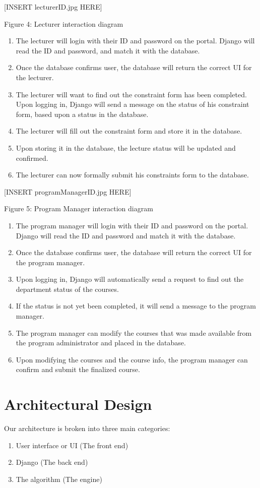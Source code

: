 \documentclass[12pt,article]{memoir}
\begin{document}
[INSERT lecturerID.jpg HERE]

 Figure 4: Lecturer interaction diagram

\begin{enumerate}
\item The lecturer will login with their ID and password on the portal. Django will read the ID and password, and match it with the database. 
\item Once the database confirms user, the database will return the correct UI for the lecturer.
\item The lecturer will want to find out the constraint form has been completed. Upon logging in, Django will send a message on the status of his constraint form, based upon a status in the database.
\item The lecturer will fill out the constraint form and store it in the database.
\item Upon storing it in the database, the lecture status will be updated and confirmed. 
\item The lecturer can now formally submit his constraints form to the database. 
\end{enumerate}

[INSERT programManagerID.jpg HERE]
 
 Figure 5: Program Manager interaction diagram

\begin{enumerate}
\item The program manager will login with their ID and password on the portal. Django will read the ID and password and match it with the database. 
\item Once the database confirms user, the database will return the correct UI for the program manager.
\item Upon logging in, Django will automatically send a request to find out the department status of the courses. 
\item If the status is not yet been completed, it will send a message to the program manager.
\item The program manager can modify the courses that was made available from the program administrator and placed in the database. 
\item Upon modifying the courses and the course info, the program manager can confirm and submit the finalized course. 
\end{enumerate}


\chapter{Architectural Design} %
Our architecture is broken into three main categories:
\begin{enumerate}
\item User interface or UI (The front end)
\item Django (The back end)
\item The algorithm (The engine)
\end{enumerate}
\end{document}
